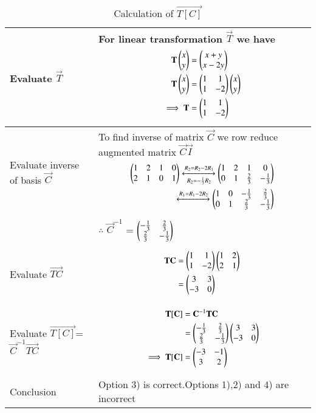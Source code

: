 \begin{table}[h!]
\begin{center}
\begin{tabular}{|m{2.2cm}|m{6.3cm}|}\hline
        Evaluate $\vec{T}$ & For linear transformation $\vec{T}$ we have {\begin{align*}
            \mathbf{T}\begin{pmatrix}x\\y\end{pmatrix} &= \begin{pmatrix}x+y\\x-2y\end{pmatrix}\\
            \mathbf{T}\begin{pmatrix}x\\y\end{pmatrix} &= \begin{pmatrix}1&1\\1&-2\end{pmatrix}\begin{pmatrix}x\\y\end{pmatrix}\\
            \implies\mathbf{T} &= \begin{pmatrix}1&1\\1&-2\end{pmatrix}
        \end{align*}} \\
        \hline
        Evaluate inverse of basis $\vec{C}$ & To find inverse of matrix $\vec{C}$ we row reduce augmented matrix $\vec{C}$$\vec{I}$ {\begin{align*}
            \begin{pmatrix}1&2&1&0\\2&1&0&1\end{pmatrix}\xleftrightarrow[R_2=-\frac{1}{3}R_2]{R_2=R_2-2R_1}\begin{pmatrix}1&2&1&0\\0&1&\frac{2}{3}&-\frac{1}{3}\end{pmatrix}\\
            \xleftrightarrow{R_1=R_1-2R_2}\begin{pmatrix}1&0&-\frac{1}{3}&\frac{2}{3}\\0&1&\frac{2}{3}&-\frac{1}{3}\end{pmatrix}
        \end{align*}}\\
        &$\therefore$ $\vec{C}^{-1}$ = $\begin{pmatrix}-\frac{1}{3}&\frac{2}{3}\\\frac{2}{3}&-\frac{1}{3}\end{pmatrix}$ \\
        \hline
        Evaluate $\vec{TC}$ & {\begin{align*}
            \mathbf{TC} &= \begin{pmatrix}1&1\\1&-2\end{pmatrix}\begin{pmatrix}1&2\\2&1\end{pmatrix}\\
            &= \begin{pmatrix}3&3\\-3&0\end{pmatrix}
        \end{align*}}\\
        \hline
        Evaluate $\vec{T[C]}$=$\vec{C}^{-1}\vec{TC}$& {\begin{align*}
            \mathbf{T[C]} &= \mathbf{C}^{-1}\mathbf{TC}\\
            &=\begin{pmatrix}-\frac{1}{3}&\frac{2}{3}\\\frac{2}{3}&-\frac{1}{3}\end{pmatrix}\begin{pmatrix}3&3\\-3&0\end{pmatrix}\\
            \implies \mathbf{T[C]} &= \begin{pmatrix}-3&-1\\3&2\end{pmatrix}
        \end{align*}} \\
        \hline
        Conclusion&Option 3) is correct.Options 1),2) and 4) are incorrect\\
        \hline
    \end{tabular}
    \end{center}
    \caption{Calculation of $\vec{T[C]}$}
    \label{tab:my_label1}
\end{table}
